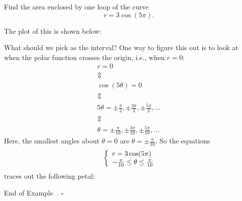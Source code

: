 \documentclass[10pt]{article}
\theoremstyle{definition}
\newtheorem{example}[theorem]{Example}
\renewenvironment{example}
{\begin{oldexample}}
  {\par\smallskip\hfill   End of Example~\theexample. $\square$    \par\end{oldexample}}
\newcommand{\1}[1]{\textbf{1}_{\left[#1\right]}} %
\begin{document}
\begin{example} Find the area enclosed by one loop of the curve
  \begin{equation*}
    r = 3\cos(5\pi).
  \end{equation*}

  The plot of this is shown below:
  \begin{center}
  \end{center}
  What should we pick as the interval? One way to figure this out is to look at when the polar function crosses the
  origin, i.e., when $r = 0$:
  \begin{gather*} 
    r = 0\\
    \Updownarrow\\
    \cos(5\theta) = 0\\
    \Updownarrow\\
    5\theta = \pm \frac{\pi}{2}, \pm \frac{3\pi}{2}, \pm \frac{5\pi}{2},\ldots\\
    \Updownarrow\\
    \theta = \pm \frac{\pi}{10}, \pm \frac{3\pi}{10}, \pm \frac{5\pi}{10},\ldots
  \end{gather*}
  Here, the smallest angles about $\theta=0$ are $\theta=\pm \frac{\pi}{10}$. So the equations
  \begin{equation*}
    \left\{ \begin{array}{l@{}l} r=3\cos(5\pi) \\ -\frac{\pi}{10} \leq \theta \leq \frac{\pi}{10}\end{array}\right.
  \end{equation*}
  traces out the following petal:
  \begin{center}
\end{center}
\end{example}
\end{document}
